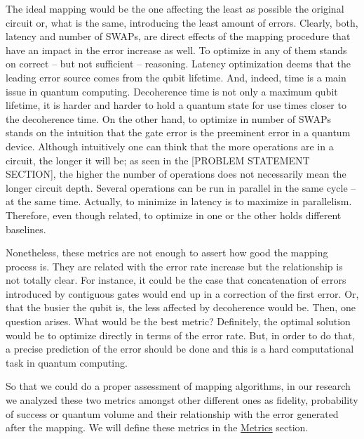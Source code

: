 The ideal mapping would be the one affecting the least as possible the original circuit or, what is the same, introducing the least amount of errors.
Clearly, both, latency and number of SWAPs, are direct effects of the mapping procedure that have an impact in the error increase as well.
To optimize in any of them stands on correct -- but not sufficient -- reasoning.
Latency optimization deems that the leading error source comes from the qubit lifetime.
And, indeed, time is a main issue in quantum computing.
Decoherence time is not only a maximum qubit lifetime, it is harder and harder to hold a quantum state for use times closer to the decoherence time.
On the other hand, to optimize in number of SWAPs stands on the intuition that the gate error is the preeminent error in a quantum device.
Although intuitively one can think that the more operations are in a circuit, the longer it will be; as seen in the [PROBLEM STATEMENT SECTION], the higher the number of operations does not necessarily mean the longer circuit depth.
Several operations can be run in parallel in the same cycle -- at the same time.
Actually, to minimize in latency is to maximize in parallelism.
Therefore, even though related, to optimize in one or the other holds different baselines.

Nonetheless, these metrics are not enough to assert how good the mapping process is.
They are related with the error rate increase but the relationship is not totally clear.
For instance, it could be the case that concatenation of errors introduced by contiguous gates would end up in a correction of the first error.
Or, that the busier the qubit is, the less affected by decoherence would be.
Then, one question arises.
What would be the best metric?
Definitely, the optimal solution would be to optimize directly in terms of the error rate.
But, in order to do that, a precise prediction of the error should be done and this is a hard computational task in quantum computing.

So that we could do a proper assessment of mapping algorithms, in our research we analyzed these two metrics amongst other different ones as fidelity, probability of success or quantum volume and their relationship with the error generated after the mapping.
We will define these metrics in the \href{chapter-3.org}{Metrics} section.
